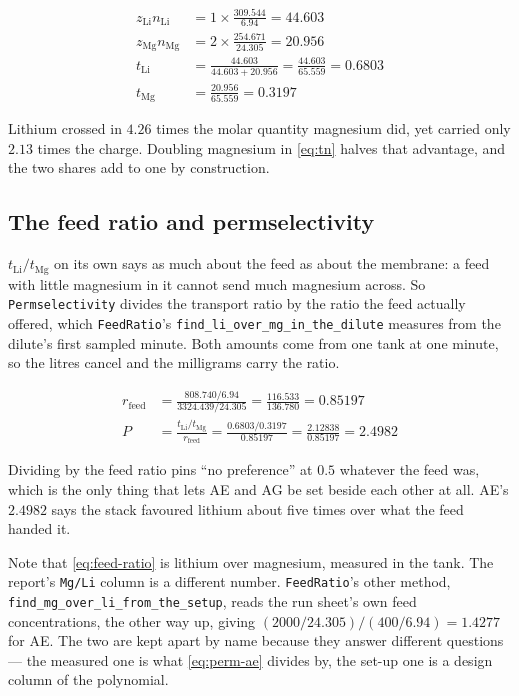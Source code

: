 \begin{align}
z_{\mathrm{Li}} n_{\mathrm{Li}} &= 1 \times \frac{309.544}{6.94}   = 44.603 \label{eq:tn} \\
z_{\mathrm{Mg}} n_{\mathrm{Mg}} &= 2 \times \frac{254.671}{24.305} = 20.956 \nonumber \\
t_{\mathrm{Li}} &= \frac{44.603}{44.603 + 20.956} = \frac{44.603}{65.559} = 0.6803
   \nonumber \\
t_{\mathrm{Mg}} &= \frac{20.956}{65.559} = 0.3197 \nonumber
\end{align}

Lithium crossed in $4.26$ times the molar quantity magnesium did, yet carried only $2.13$
times the charge. Doubling magnesium in \eqref{eq:tn} halves that advantage, and the two
shares add to one by construction.

\subsection{The feed ratio and permselectivity}

$t_{\mathrm{Li}}/t_{\mathrm{Mg}}$ on its own says as much about the feed as about the
membrane: a feed with little magnesium in it cannot send much magnesium across. So
\texttt{Permselectivity} divides the transport ratio by the ratio the feed actually offered,
which \texttt{FeedRatio}'s \texttt{find\_li\_over\_mg\_\allowbreak in\_the\_dilute} measures
from the dilute's first sampled minute. Both amounts come from one tank at one minute, so
the litres cancel and the milligrams carry the ratio.

\begin{align}
r_{\mathrm{feed}} &= \frac{808.740 / 6.94}{3324.439 / 24.305}
                   = \frac{116.533}{136.780} = 0.85197 \label{eq:feed-ratio} \\
P &= \frac{t_{\mathrm{Li}} / t_{\mathrm{Mg}}}{r_{\mathrm{feed}}}
   = \frac{0.6803 / 0.3197}{0.85197} = \frac{2.12838}{0.85197} = 2.4982 \label{eq:perm-ae}
\end{align}

Dividing by the feed ratio pins ``no preference'' at $0.5$ whatever the feed was, which is
the only thing that lets AE and AG be set beside each other at all. AE's $2.4982$ says the
stack favoured lithium about five times over what the feed handed it.

Note that \eqref{eq:feed-ratio} is lithium over magnesium, measured in the tank. The report's
\texttt{Mg/Li} column is a different number. \texttt{FeedRatio}'s other method,
\texttt{find\_mg\_over\_li\_\allowbreak from\_the\_setup}, reads the run sheet's own feed
concentrations, the other way up, giving
$(2000/24.305)/(400/6.94) = 1.4277$ for AE. The two are kept apart by name because they
answer different questions --- the measured one is what \eqref{eq:perm-ae} divides by, the set-up
one is a design column of the polynomial.

